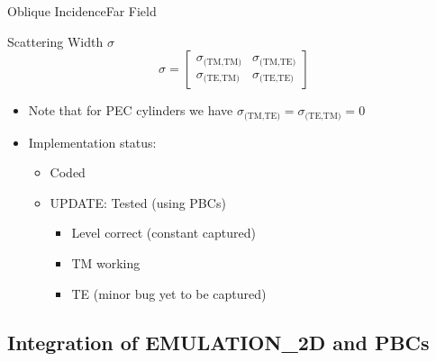 \begin{frame}[allowframebreaks]{Oblique Incidence}{Far Field}
\begin{enumerate}
    \end{enumerate}
    
    \framebreak %

    \begin{block}{Scattering Width $\sigma$}
      \begin{equation*}
        \sigma =
        \begin{bmatrix}
          \sigma_{\text{(TM,TM)}} & \sigma_{\text{(TM,TE)}} \\
          \sigma_{\text{(TE,TM)}} & \sigma_{\text{(TE,TE)}} 
        \end{bmatrix}
      \end{equation*}

      \begin{itemize}
      \item Note that for PEC cylinders we have
        $\sigma_{\text{(TM,TE)}}=\sigma_{\text{(TE,TM)}}=0$
      \end{itemize}
      
    \end{block}


    \vspace{\baselineskip}
   
    
    \begin{itemize}
    \item Implementation status:
      \begin{itemize}
      \item Coded
      \item \alert{UPDATE: Tested (using PBCs)}
        \begin{itemize}
        \item Level correct (constant captured)
        \item TM working
        \item TE (minor bug yet to be captured)
        \end{itemize}
      \end{itemize}
    \end{itemize}
    
\end{frame}
  

\subsection{Integration of EMULATION\_2D and PBCs}


